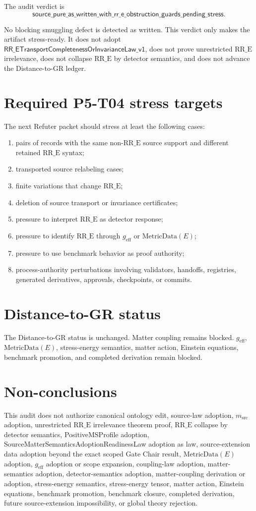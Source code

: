 \documentclass[11pt]{article}
\newcommand{\RRE}{\mathrm{RR\_E}}
\newcommand{\MetricData}{\mathrm{MetricData}(E)}
\newcommand{\geff}{g_{\mathrm{eff}}}
\newcommand{\Source}{\mathrm{src}}
\newcommand{\AuditVerdict}{\mathsf{source\_pure\_as\_written\_with\_rr\_e\_obstruction\_guards\_pending\_stress}}
\newcommand{\MissingLaw}{\mathsf{RR\_ETransportCompletenessOrInvarianceLaw\_v1}}
\begin{document}
The audit verdict is
\[
  \AuditVerdict .
\]

No blocking smuggling defect is detected as written.  This verdict only makes
the artifact stress-ready.  It does not adopt \(\MissingLaw\), does not prove
unrestricted \(\RRE\) irrelevance, does not collapse \(\RRE\) by detector
semantics, and does not advance the Distance-to-GR ledger.

\section{Required P5-T04 stress targets}

The next Refuter packet should stress at least the following cases:
\begin{enumerate}[label=(\alph*)]
  \item pairs of records with the same non-\(\RRE\) source support and
  different retained \(\RRE\) syntax;
  \item transported source relabeling cases;
  \item finite variations that change \(\RRE\);
  \item deletion of source transport or invariance certificates;
  \item pressure to interpret \(\RRE\) as detector response;
  \item pressure to identify \(\RRE\) through \(\geff\) or \(\MetricData\);
  \item pressure to use benchmark behavior as proof authority;
  \item process-authority perturbations involving validators, handoffs,
  registries, generated derivatives, approvals, checkpoints, or commits.
\end{enumerate}

\section{Distance-to-GR status}

The Distance-to-GR status is unchanged.  Matter coupling remains blocked.
\(\geff\), \(\MetricData\), stress-energy semantics, matter action, Einstein
equations, benchmark promotion, and completed derivation remain blocked.

\section{Non-conclusions}

This audit does not authorize canonical ontology edit, source-law adoption,
\(m_{\Source}\) adoption, unrestricted \(\RRE\) irrelevance theorem proof,
\(\RRE\) collapse by detector semantics, PositiveMSProfile adoption,
SourceMatterSemanticsAdoptionReadinessLaw adoption as law, source-extension
data adoption beyond the exact scoped Gate Chair result, \(\MetricData\)
adoption, \(\geff\) adoption or scope expansion, coupling-law adoption,
matter-semantics adoption, detector-semantics adoption, matter-coupling
derivation or adoption, stress-energy semantics, stress-energy tensor, matter
action, Einstein equations, benchmark promotion, benchmark closure, completed
derivation, future source-extension impossibility, or global theory rejection.
\end{document}
